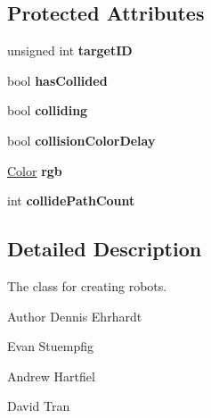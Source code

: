 \subsection*{Protected Attributes}
\begin{DoxyCompactItemize}
\item 
\hypertarget{classRobotClass_a240d6890688ff265502af1df8c19d551}{unsigned int {\bfseries target\-I\-D}}\label{classRobotClass_a240d6890688ff265502af1df8c19d551}

\item 
\hypertarget{classRobotClass_ae7d8b6da658cce513a960fc5041caaa9}{bool {\bfseries has\-Collided}}\label{classRobotClass_ae7d8b6da658cce513a960fc5041caaa9}

\item 
\hypertarget{classRobotClass_a56875389d1869036213e14f1cf7ed200}{bool {\bfseries colliding}}\label{classRobotClass_a56875389d1869036213e14f1cf7ed200}

\item 
\hypertarget{classRobotClass_ab649e63e502af7a6b7f02f7648e73170}{bool {\bfseries collision\-Color\-Delay}}\label{classRobotClass_ab649e63e502af7a6b7f02f7648e73170}

\item 
\hypertarget{classRobotClass_a159535ed4c75e979ac89dfa7a6f7aa52}{\hyperlink{classColor}{Color} {\bfseries rgb}}\label{classRobotClass_a159535ed4c75e979ac89dfa7a6f7aa52}

\item 
\hypertarget{classRobotClass_a1e77b5b40fae63438d414e0af11c3ba4}{int {\bfseries collide\-Path\-Count}}\label{classRobotClass_a1e77b5b40fae63438d414e0af11c3ba4}

\end{DoxyCompactItemize}


\subsection{Detailed Description}
The class for creating robots. 

\begin{DoxyAuthor}{Author}
Dennis Ehrhardt 

Evan Stuempfig 

Andrew Hartfiel 

David Tran 
\end{DoxyAuthor}


